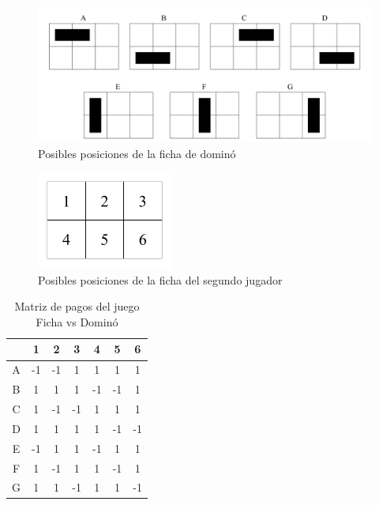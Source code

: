 \begin{figure}
\caption{Posibles posiciones de la ficha de dominó}
\label{fig:posiciones-domino}
\centering
\includegraphics[width=1\textwidth]{figuras/posiciones-domino.png}
\end{figure}

\begin{figure}
\caption{Posibles posiciones de la ficha del segundo jugador}
\label{fig:posiciones}
\centering
\includegraphics[width=0.4\textwidth]{figuras/posiciones.png}
\end{figure}

\begin{table}
\begin{center}
\caption{Matriz de pagos del juego Ficha vs Dominó}
\label{table:pagos-domino}
\begin{tabular}{ c | c | c | c | c | c | c |}
  &  1 &  2 &  3 &  4 &  5 &  6 \\ \hline
A & -1 & -1 &  1 &  1 &  1 &  1 \\ \hline
B &  1 &  1 &  1 & -1 & -1 &  1 \\ \hline
C &  1 & -1 & -1 &  1 &  1 &  1 \\ \hline
D &  1 &  1 &  1 &  1 & -1 & -1 \\ \hline
E & -1 &  1 &  1 & -1 &  1 &  1 \\ \hline
F &  1 & -1 &  1 &  1 & -1 &  1 \\ \hline
G &  1 &  1 & -1 &  1 &  1 & -1 \\ \hline
\end{tabular}
\end{center}
\end{table}


